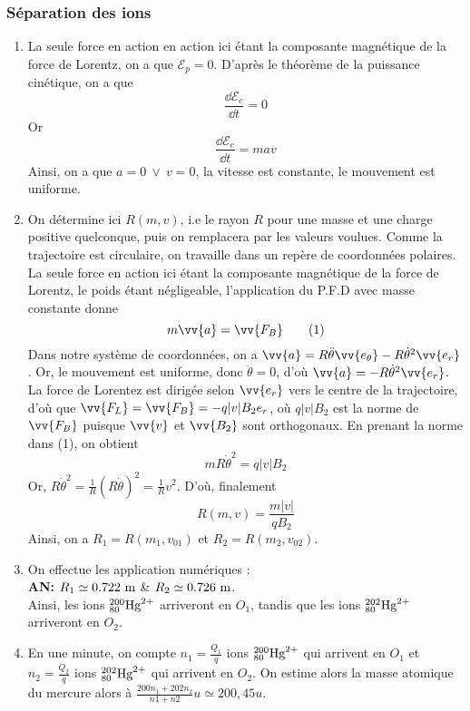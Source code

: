 \documentclass[17pt]{article}
\def\Ec{\mathcal{E}_c}
\def\Ep{\mathcal{E}_p}
\begin{document}
	\subsubsection*{Séparation des ions}
	\begin{enumerate}[start=7]
		\item La seule force en action en action ici étant la composante magnétique de la force de Lorentz, on a que $\Ep=0$. D'après le théorème de la puissance cinétique, on a que \[\frac{\dd\Ec}{\dd t}=0\]
		Or \[\frac{\dd\Ec}{\dd t}=mav\]
		Ainsi, on a que $a=0\ \vee \ v=0$, la vitesse est constante, le mouvement est uniforme.
		\item On détermine ici $R(m,v)$, i.e le rayon $R$ pour une masse et une charge positive quelconque, puis on remplacera par les valeurs voulues. Comme la trajectoire est circulaire, on travaille dans un repère de coordonnées polaires. La seule force en action ici étant la composante magnétique de la force de Lorentz, le poids étant négligeable, l'application du P.F.D avec masse constante donne \[m\vv{a}=\vv{F_B}\tag{1}\]
		Dans notre système de coordonnées, on a $\vv{a}=R\ddot\theta\vv{e_\theta}-R\dot\theta^2\vv{e_r}$. Or, le mouvement est uniforme, donc $\ddot\theta=0$, d'où $\vv{a}=-R\dot\theta^2\vv{e_r}$. La force de Lorentez est dirigée selon $\vv{e_r}$ vers le centre de la trajectoire, d'où que $\vv{F_L}=\vv{F_B}=-q|v|B_2e_r$, où $q|v|B_2$ est la norme de $\vv{F_B}$ puisque $\vv{v}$ et $\vv{B_2}$ sont orthogonaux. En prenant la norme dans (1), on obtient \[mR\dot\theta^2=q|v|B_2\]
		Or, $R\dot\theta^2=\frac1R(R\dot\theta)^2=\frac1Rv^2$. D'où, finalement \[R(m,v)=\frac{m|v|}{qB_2}\]
		Ainsi, on a $\boxed{R_1=R(m_1,v_{01})}$ et $\boxed{R_2=R(m_2,v_{02})}$.
		\item On effectue les application numériques : \\
		\textbf{AN:} $R_1\simeq 0.722\ \text m$ \& $R_2\simeq 0.726\ \text m$.\\
		Ainsi, les ions $\hbox{}^{200}_{80}\text{Hg}^{2+}$ arriveront en $O_1$, tandis que les ions $\hbox{}^{202}_{80}\text{Hg}^{2+}$ arriveront en $O_2$. 
		\item En une minute, on compte $n_1=\frac{Q_1}q$ ions $\hbox{}^{200}_{80}\text{Hg}^{2+}$ qui arrivent en $O_1$ et $n_2=\frac{Q_2}q$ ions $\hbox{}^{202}_{80}\text{Hg}^{2+}$ qui arrivent en $O_2$. On estime alors la masse atomique du mercure alors à $\frac{200n_1+202n_2}{n1+n2}u\simeq 200,45u$. \\

		\end{enumerate}
\end{document}
